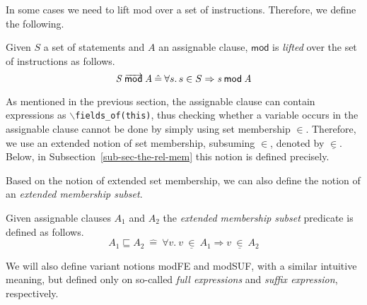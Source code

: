\documentclass[a4paper]{llncs}
\newcommand{\defn}[1]{\:\hat{#1}\:}
\newcommand{\MOD}[2]{\ensuremath{\mathit{#1}\:\mathsf{mod}\:\ensuremath{\mathit{#2}}}}
\newcommand{\MODS}[2]{\ensuremath{\mathit{#1}\:\mathsf{mod}\hspace*{-1.8em}\overrightarrow{\phantom{\mathsf{mop}}}\:\mathit{#2}}}
\newcommand{\extmember}[2]{\ensuremath{#1\: \underline\in\: #2}}
\newcommand{\extsubset}[2]{\ensuremath{#1 \sqsubseteq #2}}
\newcommand{\fieldsofarg}[1]{\texttt{\(\backslash\)fields\_of(#1)}}
\begin{document}
In some cases we need to lift \textsf{mod} over a set of
instructions. Therefore, we define the following.

\begin{definition}
\label{def-mod-lis}
Given \(S\) a set of statements and \(A\) an assignable clause,
\(\mathsf{mod}\) is \emph{lifted} over the set of instructions as follows.
\[\MODS{S}{A} \defn{=}\forall s.\,s\in S\Rightarrow \MOD{s}{A}\]
\end{definition}

As mentioned in the previous section, the assignable clause can
contain expressions as
\fieldsofarg{this}, thus checking whether a
variable occurs in the assignable clause cannot be done by simply using set
membership \(\in\). Therefore, we use an extended notion of set
membership, subsuming \(\in\), denoted by \(\underline\in\). Below, in 
Subsection~\ref{sub-sec-the-rel-mem} this notion is defined precisely.

Based on the notion of extended set membership, we can also define the
notion of an \emph{extended membership subset}.

\begin{definition}
\label{def-subseq}
Given assignable clauses \(A_1\) and \(A_2\) the \emph{extended
membership subset} predicate is  defined as follows.
\[\extsubset{A_1}{A_2} \defn{=} \forall v.\ \extmember{v}{A_1}
\Rightarrow \extmember{v}{A_2}\]
\end{definition} 


We will also define variant notions \textsf{modFE} and
\textsf{modSUF}, with a similar intuitive meaning, but
defined only on so-called \emph{full expressions} and \emph{suffix
expression}, respectively.
\end{document}
